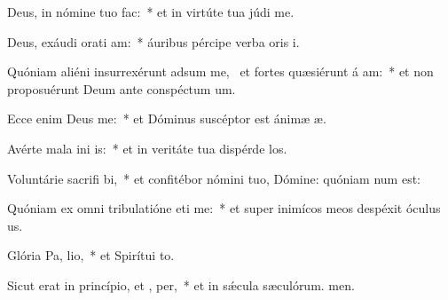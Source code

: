 \item Deus, in nómine tuo   fac:~* et in virtúte tua júdi me.
\item Deus, exáudi orati am:~* áuribus pércipe verba oris i.
\item Quóniam aliéni insurrexérunt adsum me,~\pscross{} et fortes quæsiérunt á am:~* et non proposuérunt Deum ante conspéctum um.
\item Ecce enim Deus  me:~* et Dóminus suscéptor est ánimæ æ.
\item Avérte mala ini is:~* et in veritáte tua dispérde los.
\item Voluntárie sacrifi bi,~* et confitébor nómini tuo, Dómine: quóniam num est:
\item Quóniam ex omni tribulatióne eti me:~* et super inimícos meos despéxit óculus us.
\item Glória Pa,  lio,~* et Spirítui to.
\item Sicut erat in princípio, et ,  per,~* et in sǽcula sæculórum. men.
